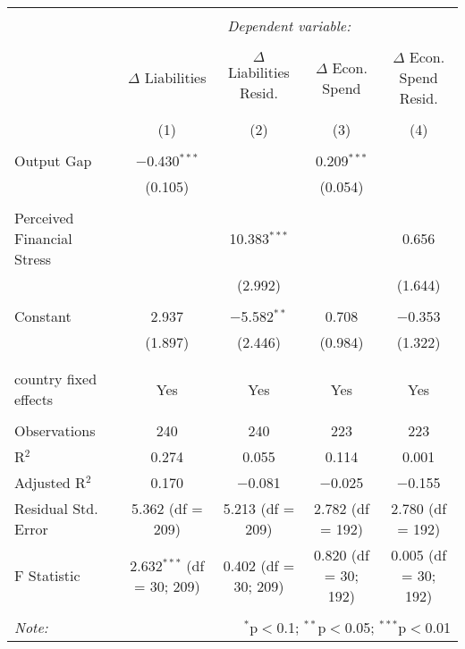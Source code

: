 
\begingroup 
\footnotesize 
\begin{tabular}{@{\extracolsep{5pt}}lcccc} 
\\[-1.8ex]\hline 
\hline \\[-1.8ex] 
 & \multicolumn{4}{c}{\textit{Dependent variable:}} \\ 
\cline{2-5} 
\\[-1.8ex] & $\Delta$ Liabilities & $\Delta$ Liabilities Resid. & $\Delta$ Econ. Spend & $\Delta$ Econ. Spend Resid. \\ 
\\[-1.8ex] & (1) & (2) & (3) & (4)\\ 
\hline \\[-1.8ex] 
 Output Gap & $-$0.430$^{***}$ &  & 0.209$^{***}$ &  \\ 
  & (0.105) &  & (0.054) &  \\ 
  & & & & \\ 
 Perceived Financial Stress &  & 10.383$^{***}$ &  & 0.656 \\ 
  &  & (2.992) &  & (1.644) \\ 
  & & & & \\ 
 Constant & 2.937 & $-$5.582$^{**}$ & 0.708 & $-$0.353 \\ 
  & (1.897) & (2.446) & (0.984) & (1.322) \\ 
  & & & & \\ 
\hline \\[-1.8ex] 
country fixed effects & Yes & Yes & Yes & Yes \\ 
\hline \\[-1.8ex] 
Observations & 240 & 240 & 223 & 223 \\ 
R$^{2}$ & 0.274 & 0.055 & 0.114 & 0.001 \\ 
Adjusted R$^{2}$ & 0.170 & $-$0.081 & $-$0.025 & $-$0.155 \\ 
Residual Std. Error & 5.362 (df = 209) & 5.213 (df = 209) & 2.782 (df = 192) & 2.780 (df = 192) \\ 
F Statistic & 2.632$^{***}$ (df = 30; 209) & 0.402 (df = 30; 209) & 0.820 (df = 30; 192) & 0.005 (df = 30; 192) \\ 
\hline 
\hline \\[-1.8ex] 
\textit{Note:}  & \multicolumn{4}{r}{$^{*}$p$<$0.1; $^{**}$p$<$0.05; $^{***}$p$<$0.01} \\ 
\end{tabular} 
\endgroup 
